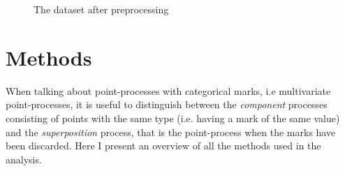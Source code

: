 \documentclass[12pt,a4paper,oneside,article]{memoir}
\begin{document}
\begin{figure}[htb]
  \begin{adjustwidth}{-2in}{-2in}
	  \centering
  \end{adjustwidth}
  \caption{The dataset after preprocessing}
  \label{fig:lansing_processed}
\end{figure}

\section{Methods}

When talking about point-processes with categorical marks, i.e multivariate point-processes,
it is useful to distinguish between the \emph{component} processes consisting of points with 
the same type (i.e. having a mark of the same value) and the \emph{superposition} process, that is the point-process
when the marks have been discarded. Here I present an overview of all the methods used in the analysis.
\end{document}
